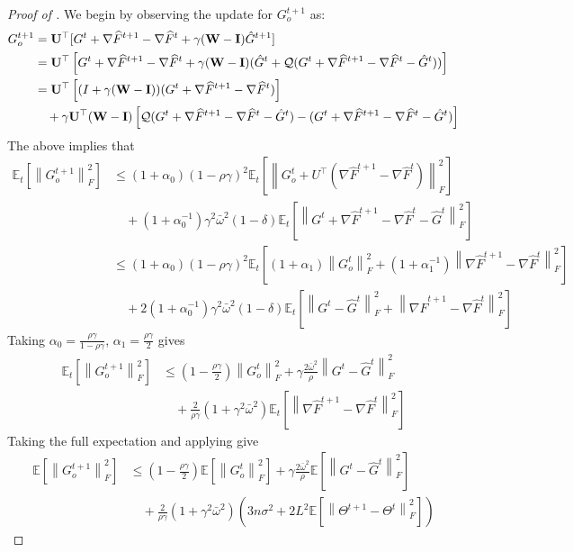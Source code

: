\documentclass[10pt]{article} %
\theoremstyle{plain}
\theoremstyle{definition}
\theoremstyle{remark}
\newcommand{\bw}{\bar{\omega}}
\newcommand{\norm}[1]{\left\| #1 \right\|}
\newcommand{\nl}{\nonumber\\}
\newcommand{\W}{{\bf W}}
\newcommand{\U}{{\bf U}}
\newcommand{\I}{{\bf I}}
\newcommand{\grdSF}{\nabla \widehat{F}}
\begin{document}
\begin{proof}[Proof of ] 
We begin by observing the update for $G_o^{t+1}$ as:
\begin{align*}
G^{t+1}_o &= \U^\top[G^t +  \grdSF^{t+1} -  \grdSF^t +\gamma(\W-\I)\hat{G}^{t+1}] \\
& = \U^\top \left[ G^t +  \grdSF^{t+1} -  \grdSF^t +\gamma(\W-\I) ( \hat{G}^t + {\cal Q}( G^t + \grdSF^{t+1} - \grdSF^t - \hat{G}^t ) ) \right] \\
& = \U^\top \left[ ( I + \gamma(\W-\I) ) ( G^t +  \grdSF^{t+1} -  \grdSF^t )  \right] \\
& \quad + \gamma \U^\top (\W-\I) \left[ {\cal Q}( G^t + \grdSF^{t+1} - \grdSF^t - \hat{G}^t ) - (G^t + \grdSF^{t+1} - \grdSF^t - \hat{G}^t) \right] 
\end{align*}
The above implies that 
\begin{align*}
\mathbb{E}_t \left[ \norm{G_o^{t+1}}_F^2 \right] & \leq (1 + \alpha_0) ( 1 - \rho \gamma )^2 \mathbb{E}_t \left[ \norm{ G_o^t + U^\top ( \grdSF^{t+1} - \grdSF^t ) }_F^2 \right] \\ 
& \quad + (1 + \alpha_0^{-1}) \gamma^2 \bw^2 (1 - \delta) \mathbb{E}_t \left[ \norm{ G^t + \grdSF^{t+1} - \grdSF^t - \hat{G}^t }_F^2 \right] \\
& \leq (1 + \alpha_0) ( 1 - \rho \gamma )^2 \mathbb{E}_t \left[ (1 + \alpha_1) \norm{ G_o^t }_F^2 + (1 + \alpha_1^{-1}) \norm{ \grdSF^{t+1} - \grdSF^t }_F^2 \right] \nl 
& \quad + 2 (1 + \alpha_0^{-1}) \gamma^2 \bw^2 (1 - \delta) \mathbb{E}_t \left[ \norm{ G^t - \hat{G}^t }_F^2 + \norm{ \grdSF^{t+1} - \grdSF^t }_F^2 \right]
\end{align*}
Taking $\alpha_0 = \frac{ \rho \gamma }{ 1 - \rho \gamma }$, $\alpha_1 = \frac{\rho \gamma}{2}$ gives
\begin{align*}
\mathbb{E}_t \left[ \norm{G_o^{t+1}}_F^2 \right] & \leq \left( 1 - \frac{ \rho \gamma }{2} \right) \norm{ G_o^t }_F^2 + \gamma \frac{ 2 \bw^2}{ \rho } \norm{ G^t - \hat{G}^t }_F^2 \nl 
& \quad + \frac{2}{\rho \gamma} \left( 1 + \gamma^2 \bw^2 \right) \mathbb{E}_t \left[ \norm{ \grdSF^{t+1} - \grdSF^t }_F^2 \right]
\end{align*}
Taking the full expectation and applying  give
\begin{align*}
\mathbb{E} \left[ \norm{G_o^{t+1}}_F^2 \right] & \leq \left( 1 - \frac{ \rho \gamma }{2} \right) \mathbb{E} \left[ \norm{ G_o^t }_F^2 \right] + \gamma \frac{ 2 \bw^2}{ \rho } \mathbb{E} \left[ \norm{ G^t - \hat{G}^t }_F^2 \right] \nl 
& \quad + \frac{2}{\rho \gamma} \left( 1 + \gamma^2 \bw^2 \right) \left( 3 n \sigma^2 + 2L^2 \mathbb{E} \left[ \norm{ \Theta^{t+1} - \Theta^t }_F^2 \right] \right)

\end{align*}
\end{proof}
\end{document}
